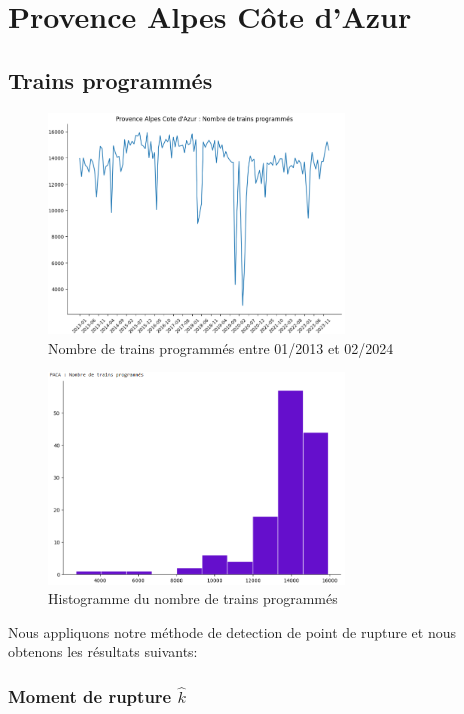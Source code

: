 {\section{Provence Alpes Côte d'Azur}

\subsection{Trains programmés}

\begin{figure}[H]
  \centering
  \includegraphics[width=0.7\textwidth]{PACA_TP_1.png}
  \caption{Nombre de trains programmés entre 01/2013 et 02/2024}
\end{figure}

\begin{figure}[H]
  \centering
  \includegraphics[width=0.7\textwidth]{PACA_TP_2.png}
  \caption{Histogramme du nombre de trains programmés}
\end{figure}

Nous appliquons notre méthode de detection de point de rupture et nous obtenons les résultats suivants:

\subsubsection{Moment de rupture $\hat{k}$}

}
